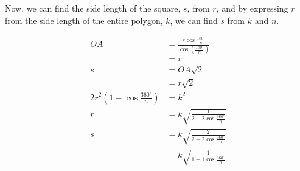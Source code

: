 \documentclass[12pt]{scrartcl}
\begin{document}
Now, we can find the side length of the square, $s$, from $r$, and by expressing $r$ from the side length of the entire polygon, $k$, we can find $s$ from $k$ and $n$.

\begin{align*}
	OA & = \frac{r \cos \frac{180^{\circ}}{n}}{\cos \left(\frac{180^{\circ}}{n}\right)}  \\
	& = r  \\
	s & = OA\sqrt{2} \\
	& = r\sqrt{2} \\
	2r^2 \left(1 - \cos \frac{360^{\circ}}{n}\right) & = k^2  \\
	r & = k\sqrt{\frac{1}{2 - 2\cos\frac{360^{\circ}}{n}}}  \\
	s & = k\sqrt{\frac{2}{2 - 2\cos\frac{360^{\circ}}{n}}}  \\
	& = k\sqrt{\frac{1}{1 - 1\cos\frac{360^{\circ}}{n}}}
\end{align*}

\printbibliography
\end{document}
